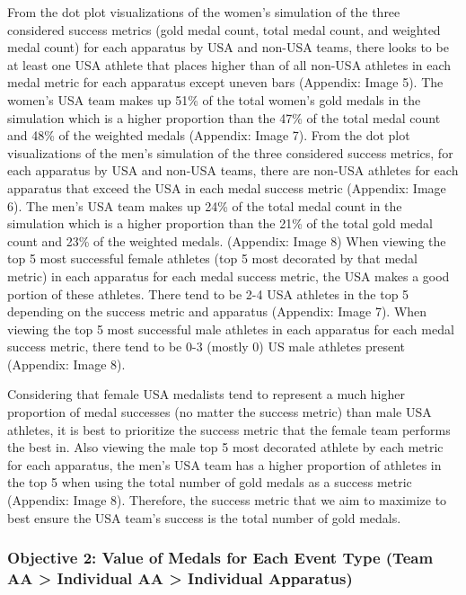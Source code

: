 \documentclass[
  letterpaper,
  DIV=11,
  numbers=noendperiod]{scrartcl}
\begin{document}
From the dot plot visualizations of the women's simulation of the three
considered success metrics (gold medal count, total medal count, and
weighted medal count) for each apparatus by USA and non-USA teams, there
looks to be at least one USA athlete that places higher than of all
non-USA athletes in each medal metric for each apparatus except uneven
bars (Appendix: Image 5). The women's USA team makes up 51\% of the
total women's gold medals in the simulation which is a higher proportion
than the 47\% of the total medal count and 48\% of the weighted medals
(Appendix: Image 7). From the dot plot visualizations of the men's
simulation of the three considered success metrics, for each apparatus
by USA and non-USA teams, there are non-USA athletes for each apparatus
that exceed the USA in each medal success metric (Appendix: Image 6).
The men's USA team makes up 24\% of the total medal count in the
simulation which is a higher proportion than the 21\% of the total gold
medal count and 23\% of the weighted medals. (Appendix: Image 8) When
viewing the top 5 most successful female athletes (top 5 most decorated
by that medal metric) in each apparatus for each medal success metric,
the USA makes a good portion of these athletes. There tend to be 2-4 USA
athletes in the top 5 depending on the success metric and apparatus
(Appendix: Image 7). When viewing the top 5 most successful male
athletes in each apparatus for each medal success metric, there tend to
be 0-3 (mostly 0) US male athletes present (Appendix: Image 8).

Considering that female USA medalists tend to represent a much higher
proportion of medal successes (no matter the success metric) than male
USA athletes, it is best to prioritize the success metric that the
female team performs the best in. Also viewing the male top 5 most
decorated athlete by each metric for each apparatus, the men's USA team
has a higher proportion of athletes in the top 5 when using the total
number of gold medals as a success metric (Appendix: Image 8).
Therefore, the success metric that we aim to maximize to best ensure the
USA team's success is the total number of gold medals.

\hypertarget{objective-2-value-of-medals-for-each-event-type-team-aa-individual-aa-individual-apparatus}{%
\subsubsection{Objective 2: Value of Medals for Each Event Type (Team AA
\textgreater{} Individual AA \textgreater{} Individual
Apparatus)}\label{objective-2-value-of-medals-for-each-event-type-team-aa-individual-aa-individual-apparatus}}
\end{document}
